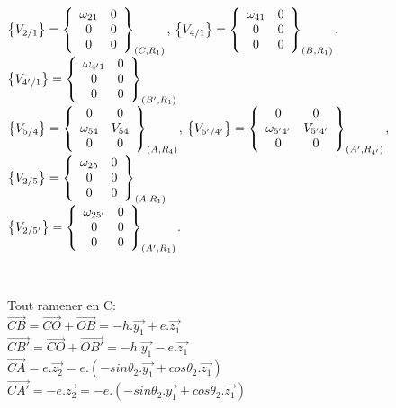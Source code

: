 $\left\{V_{2/1}\right\}=\left\{\begin{array}{c c} \omega_{21} & 0 \\ 0 & 0 \\ 0 & 0
\end{array}\right\}_{(C,R_1)}$,
$\left\{V_{4/1}\right\}=\left\{\begin{array}{c c} \omega_{41} & 0 \\ 0 & 0 \\ 0 & 0
\end{array}\right\}_{(B,R_1)}$,
$\left\{V_{4'/1}\right\}=\left\{\begin{array}{c c} \omega_{4'1} & 0 \\ 0 & 0 \\ 0 & 0
\end{array}\right\}_{(B',R_1)}$\\
$\left\{V_{5/4}\right\}=\left\{\begin{array}{c c} 0 & 0 \\ \omega_{54} & V_{54} \\ 0 & 0
\end{array}\right\}_{(A,R_4)}$,
$\left\{V_{5'/4'}\right\}=\left\{\begin{array}{c c} 0 & 0 \\ \omega_{5'4'} & V_{5'4'} \\ 0 & 0\end{array}\right\}_{(A',R_{4'})}$,
$\left\{V_{2/5}\right\}=\left\{\begin{array}{c c} \omega_{25} & 0 \\ 0 & 0 \\ 0 & 0
\end{array}\right\}_{(A,R_1)}$\\
$\left\{V_{2/5'}\right\}=\left\{\begin{array}{c c} \omega_{25'} & 0 \\ 0 & 0 \\ 0 & 0\end{array}\right\}_{(A',R_1)}$.

~\

Tout ramener en C:\\
$\overrightarrow{CB}=\overrightarrow{CO}+\overrightarrow{OB}=-h.\overrightarrow{y_1}+e.\overrightarrow{z_1}$\\
$\overrightarrow{CB'}=\overrightarrow{CO}+\overrightarrow{OB'}=-h.\overrightarrow{y_1}-e.\overrightarrow{z_1}$\\
$\overrightarrow{CA}=e.\overrightarrow{z_2}=e.(-sin\theta_2.\overrightarrow{y_1}+cos\theta_2.\overrightarrow{z_1})$\\
$\overrightarrow{CA'}=-e.\overrightarrow{z_2}=-e.(-sin\theta_2.\overrightarrow{y_1}+cos\theta_2.\overrightarrow{z_1})$

